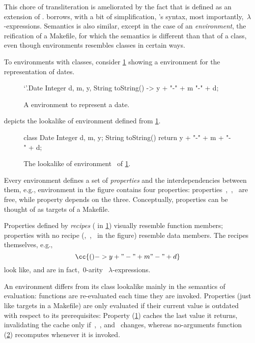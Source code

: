 This chore of transliteration is ameliorated by the fact that \Reap is defined
as an extension of \Java. \Reap borrows, with a bit of simplification, \Java's
syntax, most importantly,~$λ$-expressions. Semantics is also similar, except
in the case of an \emph{environment}, the \Reap reification of a
Makefile, for which the semantics is different than that of a \Java class, 
even though environments resembles classes in certain ways.

To environments with classes, consider \cref{figure:date:reap} showing a \Reap
environment for the representation of dates.

\begin{figure}
  \caption{\label{figure:date:reap}%
    A \Reap environment to represent a date.
  }
\begin{reap}
`'.Date {
  Integer d, m, y,
  String toString() -> y + "-" + m "-" + d;
}
\end{reap}
\end{figure}

 depicts the \Java {} lookalike of environment
 defined from \cref{figure:date:reap}.

\begin{figure}
  \caption{\label{figure:date:java}%
The \Java {} lookalike of environment~ of
\cref{figure:date:reap}.
  }
\begin{java}
class Date {
  Integer d, m, y;
  String toString() {
    return y + "-" + m + "-" + d;
  }
}
\end{java}
\end{figure}

Every environment defines a set of \emph{properties} and the interdependencies
between them, e.g., environment  in the figure contains four
properties: properties~,~,~ are free, while property
 depends on the three. Conceptually, properties can be thought of
as {targets} of a Makefile.

Properties defined by \emph{recipes} ( in \cref{figure:date:reap})
visually resemble function members; properties with no recipe
(,~,~ in the figure) resemble data members.
The recipes themselves, e.g.,
\[
  \cc{() -> y + "-" + m "-" + d}
\]
look like, and are in fact,~$0$-arity \Java~$λ$-expressions.

An environment differs from its class lookalike mainly in the semantics of
evaluation: functions are re-evaluated each time they are invoked. Properties
(just like targets in a Makefile) are only evaluated if their current value is
outdated with respect to its prerequisites: Property 
(\cref{figure:date:reap}) caches the last value it returns, invalidating the
cache only if~,~, and~ changes, whereas no-arguments function
 (\cref{figure:date:java}) recomputes whenever it is invoked.


